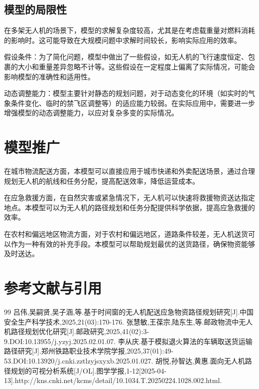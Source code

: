 \documentclass[a4paper]{article} %
\begin{document}
{    
    \subsection{模型的局限性}

    在多架无人机的场景下，模型的求解复杂度较高，尤其是在考虑载重量对燃料消耗的影响时。这可能导致在大规模问题中求解时间较长，影响实际应用的效率。

    假设条件：为了简化问题，模型中做出了一些假设，如无人机的飞行速度恒定、包裹的大小和重量差异忽略不计等。这些假设在一定程度上偏离了实际情况，可能会影响模型的准确性和适用性。

    动态调整能力：模型主要针对静态的规划问题，对于动态变化的环境（如实时的气象条件变化、临时的禁飞区调整等）的适应能力较弱。在实际应用中，需要进一步增强模型的动态调整能力，以应对复杂多变的实际情况。


    \section{模型推广}
    
    在城市物流配送方面，本模型可以直接应用于城市快递和外卖配送场景，通过合理规划无人机的航线和任务分配，提高配送效率，降低运营成本。

    在应急救援方面，在自然灾害或紧急情况下，无人机可以快速将救援物资送达指定地点。本模型可以为无人机的路径规划和任务分配提供科学依据，提高应急救援的效率。

    在农村和偏远地区物流方面，对于农村和偏远地区，道路条件较差，无人机送货可以作为一种有效的补充手段。本模型可以帮助规划最优的送货路径，确保物资能够及时送达。


    \section{参考文献与引用}
\renewcommand{\refname}{参考文献} %
    \begin{thebibliography}{99}  
吕伟,吴嗣贤,吴子涵,等.基于时间窗的无人机配送应急物资路径规划研究[J].中国安全生产科学技术,2025,21(03):170-176. 
张慧敏,王葆宗,陆东生,等.邮政物流中无人机路径规划优化研究[J].邮政研究,2025,41(02):3-9.DOI:10.13955/j.yzyj.2025.02.01.07.
李从庆.基于模拟退火算法的车辆取送货运输路径研究[J].郑州铁路职业技术学院学报,2025,37(01):49-53.DOI:10.13920/j.cnki.zztlzyjsxyxb.2025.01.027.
胡悦,孙智达,黄惠.面向无人机路径规划的可视分析系统[J/OL].图学学报,1-12[2025-04-13].http://kns.cnki.net/kcms/detail/10.1034.T.20250224.1028.002.html. 
\end{thebibliography}
    \newpage

}
\end{document}
